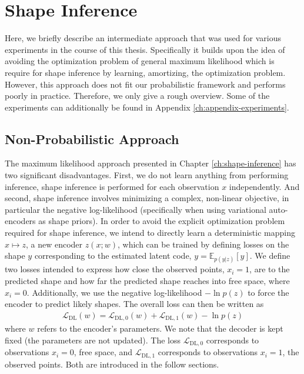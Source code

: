 \chapter{Shape Inference}
\label{ch:appendix-shape-inference}

Here, we briefly describe an intermediate approach that was used for various
experiments in the course of this thesis. Specifically it builds upon the
idea of avoiding the optimization problem of general maximum likelihood
which is require for shape inference by learning, \ie amortizing,
the optimization problem. However,
this approach does not fit our probabilistic framework and performs poorly
in practice. Therefore, we only give a rough overview. Some of the experiments
can additionally be found in Appendix \ref{ch:appendix-experiments}.

\section{Non-Probabilistic Approach}
\label{sec:shape-inference-dl}

The maximum likelihood approach presented in Chapter \ref{ch:shape-inference}
has two significant disadvantages. First, we do not learn anything from performing
inference, \ie shape inference is performed for each observation $x$
independently. And second, shape inference involves minimizing a complex, non-linear
objective, in particular the negative log-likelihood (specifically when using variational
auto-encoders as shape priors).
In order to avoid the explicit optimization problem required for shape inference,
we intend to directly learn a deterministic mapping $x \mapsto z$, \ie a new
encoder $z(x;w)$, which can be trained by defining losses on the shape $y$
corresponding to the estimated latent code, \eg $y = \mathbb{E}_{p(y|z)}[y]$.
We define two losses intended to express how close
the observed points, \ie $x_i = 1$, are to the predicted shape and
how far the predicted shape reaches into free space, \ie where $x_i = 0$.
Additionally, we use the negative log-likelihood $- \ln p(z)$ to force
the encoder to predict likely shapes. The overall loss can then be written as
\begin{align}
  \mathcal{L}_{\text{DL}}(w) = \mathcal{L}_{\text{DL},0}(w)
  + \mathcal{L}_{\text{DL},1}(w) - \ln p(z)
\end{align}
where $w$ refers to the encoder's parameters. We note that
the decoder is kept fixed (the parameters are not updated).
The loss $\mathcal{L}_{\text{DL},0}$ corresponds to observations $x_i = 0$,
\ie free space, and $\mathcal{L}_{\text{DL},1}$ corresponds to observations $x_i = 1$,
\ie the observed points. Both are introduced in the follow sections.

